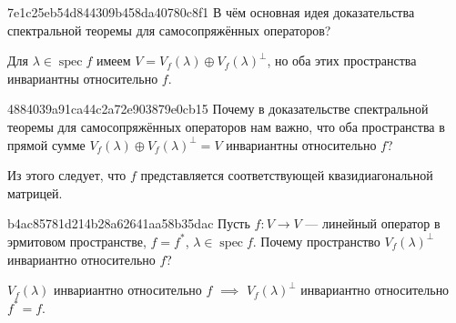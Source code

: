 
\begin{note}{7e1c25eb54d844309b458da40780c8f1}
    В чём основная идея доказательства спектральной теоремы для самосопряжённых операторов?

    \begin{cloze}{1}
        Для \({ \lambda \in \operatorname{spec} f }\) имеем \({ V = V_f(\lambda) \oplus V_f(\lambda)^{\perp} }\), но оба этих пространства инвариантны относительно \({ f }\).
    \end{cloze}
\end{note}

\begin{note}{4884039a91ca44c2a72e903879e0cb15}
    Почему в доказательстве спектральной теоремы для самосопряжённых операторов нам важно, что оба пространства в прямой сумме \({ V_f(\lambda) \oplus V_f(\lambda)^{\perp} = V }\) инвариантны относительно \({ f }\)?

    \begin{cloze}{1}
        Из этого следует, что \({ f }\) представляется соответствующей квазидиагональной матрицей.
    \end{cloze}
\end{note}

\begin{note}{b4ac85781d214b28a62641aa58b35dac}
    Пусть \({ f : V \to V }\) --- линейный оператор в эрмитовом пространстве, \({ f = f^* }\),\: \({ \lambda \in \operatorname{spec} f }\).
    Почему пространство \({ V_f(\lambda)^{\perp} }\) инвариантно относительно \({ f }\)?

    \begin{cloze}{1}
        \({ V_f(\lambda) }\) инвариантно относительно \({ f }\) \({ \implies }\) \({ V_f(\lambda)^{\perp} }\) инвариантно относительно \({ f^* = f }\).
    \end{cloze}
\end{note}

